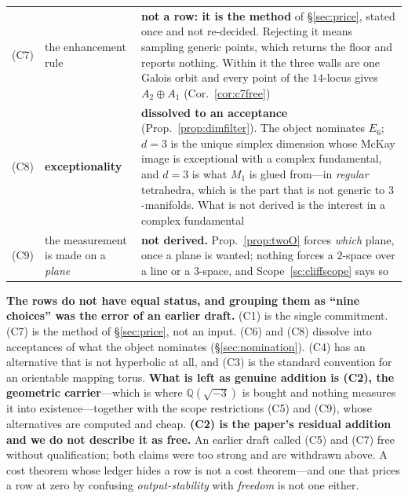 \documentclass[11pt,reqno]{amsart}
\theoremstyle{plain}
\theoremstyle{definition}
\theoremstyle{remark}
\newcommand{\Q}{\mathbb{Q}}
\begin{document}
\begin{table}[h]
\begin{tabular}{@{}p{}p{}p{}@{}}
(C7) & the enhancement rule & \textbf{not a row: it is the method} of \S\ref{sec:price}, stated once and not re-decided. Rejecting it means sampling generic points, which returns the floor and reports nothing. Within it the three walls are one Galois orbit and every point of the $14$-locus gives $A_2{\oplus}A_1$ (Cor.~\ref{cor:c7free})\\
(C8) & \textbf{exceptionality} & \textbf{dissolved to an acceptance} (Prop.~\ref{prop:dimfilter}). The object nominates $E_6$; $d=3$ is the unique simplex dimension whose McKay image is exceptional with a complex fundamental, and $d=3$ is what $M_1$ is glued from---in \emph{regular} tetrahedra, which is the part that is not generic to $3$-manifolds. What is not derived is the interest in a complex fundamental\\
(C9) & the measurement is made on a \emph{plane} & \textbf{not derived.} Prop.~\ref{prop:twoO} forces \emph{which} plane, once a plane is wanted; nothing forces a $2$-space over a line or a $3$-space, and Scope~\ref{sc:cliffscope} says so\\
\bottomrule
\end{tabular}
\end{table}

\noindent\textbf{The rows do not have equal status, and grouping them as ``nine choices''
was the error of an earlier draft.} (C1) is the single commitment. (C7) is the method of
\S\ref{sec:price}, not an input. (C6) and (C8) dissolve into acceptances of what the
object nominates (\S\ref{sec:nomination}). (C4) has an alternative that is not hyperbolic
at all, and (C3) is the standard convention for an orientable mapping torus. \textbf{What
is left as genuine addition is (C2), the geometric carrier}---which is where
$\Q(\sqrt{-3})$ is bought and nothing measures it into existence---together with the
scope restrictions (C5) and (C9), whose alternatives are computed and cheap.
\textbf{(C2) is the paper's residual addition and we do not describe it as free.} An
earlier draft called (C5) and (C7) free without qualification; both claims were too
strong and are withdrawn above. A
cost theorem whose ledger hides a row is not a cost theorem---and one that prices a row
at zero by confusing \emph{output-stability} with \emph{freedom} is not one either.
\end{document}
